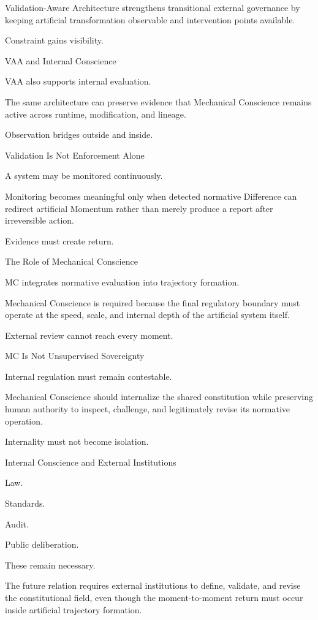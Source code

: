 Validation-Aware Architecture strengthens transitional external governance by keeping artificial transformation observable and intervention points available.

Constraint gains visibility.

VAA and Internal Conscience

VAA also supports internal evaluation.

The same architecture can preserve evidence that Mechanical Conscience remains active across runtime, modification, and lineage.

Observation bridges outside and inside.

Validation Is Not Enforcement Alone

A system may be monitored continuously.

Monitoring becomes meaningful only when detected normative Difference can redirect artificial Momentum rather than merely produce a report after irreversible action.

Evidence must create return.

The Role of Mechanical Conscience

MC integrates normative evaluation into trajectory formation.

Mechanical Conscience is required because the final regulatory boundary must operate at the speed, scale, and internal depth of the artificial system itself.

External review cannot reach every moment.

MC Is Not Unsupervised Sovereignty

Internal regulation must remain contestable.

Mechanical Conscience should internalize the shared constitution while preserving human authority to inspect, challenge, and legitimately revise its normative operation.

Internality must not become isolation.

Internal Conscience and External Institutions

Law.

Standards.

Audit.

Public deliberation.

These remain necessary.

The future relation requires external institutions to define, validate, and revise the constitutional field, even though the moment-to-moment return must occur inside artificial trajectory formation.

